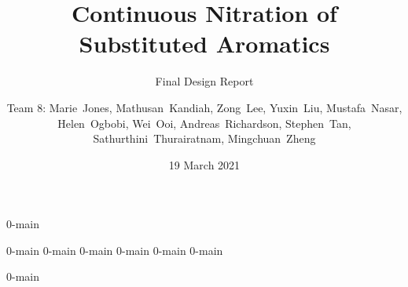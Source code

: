 \documentclass{nitroma-report}
\subtitle{Final Design Report}
\title{Continuous Nitration of Substituted Aromatics}
\author{Team 8: Marie~Jones, Mathusan~Kandiah, Zong~Lee, Yuxin~Liu, Mustafa~Nasar, Helen~Ogbobi, Wei~Ooi, Andreas~Richardson, Stephen~Tan, Sathurthini~Thurairatnam, Mingchuan~Zheng}
\date{19 March 2021}
\begin{document}
\frontmatter
\maketitle

\compactchapterspacing
{0-main}
\normalchapterspacing

\tableofcontents

\mainmatter
{0-main}
{0-main}
{0-main}
{0-main}
{0-main}
{0-main}

\begin{appendices}
    {0-main}
\end{appendices}
\end{document}
